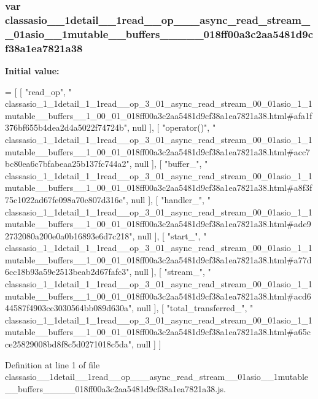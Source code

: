 \subsubsection[{classasio\+\_\+1\+\_\+1detail\+\_\+1\+\_\+1read\+\_\+\+\_\+op\+\_\+3\+\_\+01\+\_\+async\+\_\+read\+\_\+stream\+\_\+00\+\_\+01asio\+\_\+1\+\_\+1mutable\+\_\+\+\_\+buffers\+\_\+\+\_\+1\+\_\+00\+\_\+01\+\_\+018ff00a3c2aa5481d9cf38a1ea7821a38}]{\setlength{\rightskip}{0pt plus 5cm}var classasio\+\_\+\_\+1detail\+\_\+\_\+1read\+\_\+\+\_\+op\+\_\+\_\+\_\+async\+\_\+read\+\_\+stream\+\_\+\_\+01asio\+\_\+\_\+1mutable\+\_\+\+\_\+buffers\+\_\+\+\_\+\_\+\_\+\_\+018ff00a3c2aa5481d9cf38a1ea7821a38}\label{classasio__1__1detail__1__1read____op__3__01__async__read__stream__00__01asio__1__1mutable____buf9474ef329b7e31cfd7db46a0cd53986_a2afd648cf049db9195027a1d0da2e130}
{\bfseries Initial value\+:}
\begin{DoxyCode}
=
[
    [ \textcolor{stringliteral}{"read\_op"}, \textcolor{stringliteral}{"
      classasio\_1\_1detail\_1\_1read\_\_op\_3\_01\_async\_read\_stream\_00\_01asio\_1\_1mutable\_\_buffers\_\_1\_00\_01\_018ff00a3c2aa5481d9cf38a1ea7821a38.html#afa1f376bf655b4dea2d4a5022f74724b"}, null ],
    [ \textcolor{stringliteral}{"operator()"}, \textcolor{stringliteral}{"
      classasio\_1\_1detail\_1\_1read\_\_op\_3\_01\_async\_read\_stream\_00\_01asio\_1\_1mutable\_\_buffers\_\_1\_00\_01\_018ff00a3c2aa5481d9cf38a1ea7821a38.html#acc7bc80ea6c7bfabeaa25b137fc744a2"}, null ],
    [ \textcolor{stringliteral}{"buffer\_"}, \textcolor{stringliteral}{"
      classasio\_1\_1detail\_1\_1read\_\_op\_3\_01\_async\_read\_stream\_00\_01asio\_1\_1mutable\_\_buffers\_\_1\_00\_01\_018ff00a3c2aa5481d9cf38a1ea7821a38.html#a8f3f75c1022ad67fe098a70c807d316e"}, null ],
    [ \textcolor{stringliteral}{"handler\_"}, \textcolor{stringliteral}{"
      classasio\_1\_1detail\_1\_1read\_\_op\_3\_01\_async\_read\_stream\_00\_01asio\_1\_1mutable\_\_buffers\_\_1\_00\_01\_018ff00a3c2aa5481d9cf38a1ea7821a38.html#ade92732080a200e0a0b16893e6d7c218"}, null ],
    [ \textcolor{stringliteral}{"start\_"}, \textcolor{stringliteral}{"
      classasio\_1\_1detail\_1\_1read\_\_op\_3\_01\_async\_read\_stream\_00\_01asio\_1\_1mutable\_\_buffers\_\_1\_00\_01\_018ff00a3c2aa5481d9cf38a1ea7821a38.html#a77d6cc18b93a59e2513beab2d67fafc3"}, null ],
    [ \textcolor{stringliteral}{"stream\_"}, \textcolor{stringliteral}{"
      classasio\_1\_1detail\_1\_1read\_\_op\_3\_01\_async\_read\_stream\_00\_01asio\_1\_1mutable\_\_buffers\_\_1\_00\_01\_018ff00a3c2aa5481d9cf38a1ea7821a38.html#acd644587f4903cc3030564bb089d630a"}, null ],
    [ \textcolor{stringliteral}{"total\_transferred\_"}, \textcolor{stringliteral}{"
      classasio\_1\_1detail\_1\_1read\_\_op\_3\_01\_async\_read\_stream\_00\_01asio\_1\_1mutable\_\_buffers\_\_1\_00\_01\_018ff00a3c2aa5481d9cf38a1ea7821a38.html#a65cce25829008bd8f8c5d0271018c5da"}, null ]
]
\end{DoxyCode}


Definition at line 1 of file classasio\+\_\+\_\+1detail\+\_\+\_\+1read\+\_\+\+\_\+op\+\_\+\_\+\_\+async\+\_\+read\+\_\+stream\+\_\+\_\+01asio\+\_\+\_\+1mutable\+\_\+\+\_\+buffers\+\_\+\+\_\+\_\+\_\+\_\+018ff00a3c2aa5481d9cf38a1ea7821a38.\+js.

